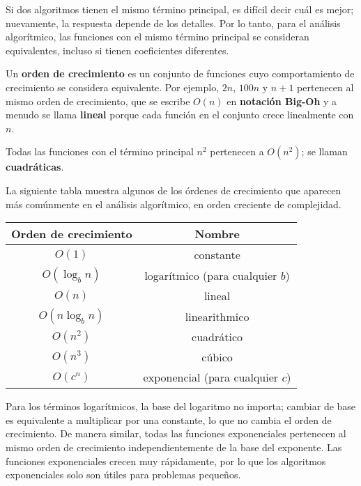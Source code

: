 Si dos algoritmos tienen el mismo término principal, es difícil decir cuál es mejor; nuevamente, la respuesta depende de los detalles. Por lo tanto, para el análisis algorítmico, las funciones con el mismo término principal se consideran equivalentes, incluso si tienen coeficientes diferentes.

Un \textbf{orden de crecimiento} es un conjunto de funciones cuyo comportamiento de crecimiento se considera equivalente. Por ejemplo, \( 2n \), \( 100n \) y \( n + 1 \) pertenecen al mismo orden de crecimiento, que se escribe \( O(n) \) en \textbf{notación Big-Oh} y a menudo se llama \textbf{lineal} porque cada función en el conjunto crece linealmente con \( n \).

Todas las funciones con el término principal \( n^2 \) pertenecen a \( O(n^2) \); se llaman \textbf{cuadráticas}.

La siguiente tabla muestra algunos de los órdenes de crecimiento que aparecen más comúnmente en el análisis algorítmico, en orden creciente de complejidad.

\begin{center}
\begin{tabular}{|c|c|}
\hline
Orden de crecimiento & Nombre \\
\hline
\( O(1) \) & constante \\
\( O(\log_b n) \) & logarítmico (para cualquier \( b \)) \\
\( O(n) \) & lineal \\
\( O(n \log_b n) \) & linearithmico \\
\( O(n^2) \) & cuadrático \\
\( O(n^3) \) & cúbico \\
\( O(c^n) \) & exponencial (para cualquier \( c \)) \\
\hline
\end{tabular}
\end{center}

Para los términos logarítmicos, la base del logaritmo no importa; cambiar de base es equivalente a multiplicar por una constante, lo que no cambia el orden de crecimiento. De manera similar, todas las funciones exponenciales pertenecen al mismo orden de crecimiento independientemente de la base del exponente. Las funciones exponenciales crecen muy rápidamente, por lo que los algoritmos exponenciales solo son útiles para problemas pequeños.

